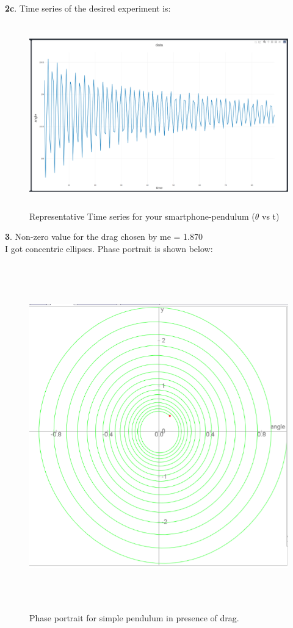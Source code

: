 \documentclass[11pt]{scrartcl} %
\begin{document}
\textbf{2c}.
Time series of the desired experiment is:
\begin{figure}[h] %
	\centering
	\includegraphics[width=12cm, height=8cm]{Figures/M 2c.png} %
	\caption {Representative Time series for your smartphone-pendulum ($\theta$ vs t)}
\end{figure}

\newpage
\textbf{3}.
Non-zero value for the drag chosen by me = 1.870 \\
I got concentric ellipses. Phase portrait is shown below:
\begin{figure}[h] %
	\centering
	\includegraphics[width=\textwidth, height=15cm]{Figures/M3.png} %
	\caption{Phase portrait for simple pendulum in presence of drag.}
\end{figure}
\end{document}
